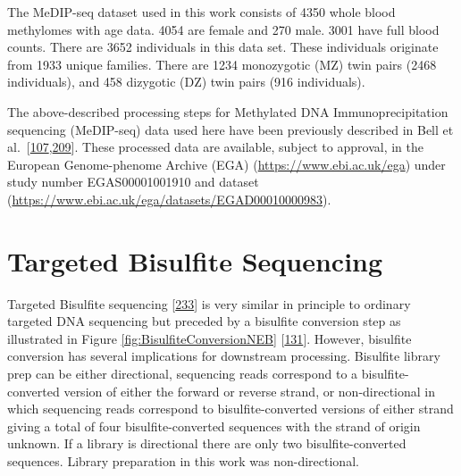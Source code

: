 \documentclass[
]{book}
\begin{document}
The MeDIP-seq dataset used in this work consists of 4350 whole blood methylomes with age data.
4054 are female and 270 male.
3001 have full blood counts.
There are 3652 individuals in this data set.
These individuals originate from 1933 unique families.
There are 1234 monozygotic (MZ) twin pairs (2468 individuals), and 458 dizygotic (DZ) twin pairs (916 individuals).

The above-described processing steps for Methylated DNA Immunoprecipitation sequencing (MeDIP-seq) data used here have been previously described in Bell et al.~{[}\protect\hyperlink{ref-Bell2017a}{107},\protect\hyperlink{ref-Bell2016}{209}{]}.
These processed data are available, subject to approval, in the European Genome-phenome Archive (EGA) (\url{https://www.ebi.ac.uk/ega}) under study number EGAS00001001910 and dataset (\url{https://www.ebi.ac.uk/ega/datasets/EGAD00010000983}).

\hypertarget{MethodsTargetedBisulfiteSequencing}{%
\section{Targeted Bisulfite Sequencing}\label{MethodsTargetedBisulfiteSequencing}}

Targeted Bisulfite sequencing {[}\protect\hyperlink{ref-Korbie2015}{233}{]} is very similar in principle to ordinary targeted DNA sequencing but preceded by a bisulfite conversion step as illustrated in Figure \ref{fig:BisulfiteConversionNEB} {[}\protect\hyperlink{ref-Bock2010}{131}{]}.
However, bisulfite conversion has several implications for downstream processing.
Bisulfite library prep can be either directional, sequencing reads correspond to a bisulfite-converted version of either the forward or reverse strand, or non-directional in which sequencing reads correspond to bisulfite-converted versions of either strand giving a total of four bisulfite-converted sequences with the strand of origin unknown.
If a library is directional there are only two bisulfite-converted sequences.
Library preparation in this work was non-directional.
\end{document}
